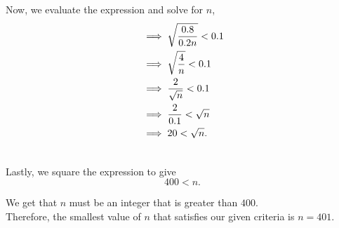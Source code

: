 \begin{subquestions}
\begin{subsubquestions}
Now, we evaluate the expression and solve for $n$,
\begin{align}
		&\implies \sqrt{\frac{0.8}{0.2n}}<0.1 \nonumber \\
		&\implies \sqrt{\frac{4}{n}}<0.1 \nonumber \\
		&\implies \frac{2}{\sqrt{n}}<0.1 \nonumber \\
		&\implies \frac{2}{0.1}<\sqrt{n} \nonumber \\
		&\implies 20<\sqrt{n}.  \\ \nonumber
	\end{align}

Lastly, we square the expression to give
\begin{equation}
	400<n.  
\end{equation}

We get that $n$ must be an integer that is greater than $400$. \\
Therefore, the smallest value of $n$ that satisfies our given criteria is $n=401$. \\

	\end{subsubquestions}  
\end{subquestions}
